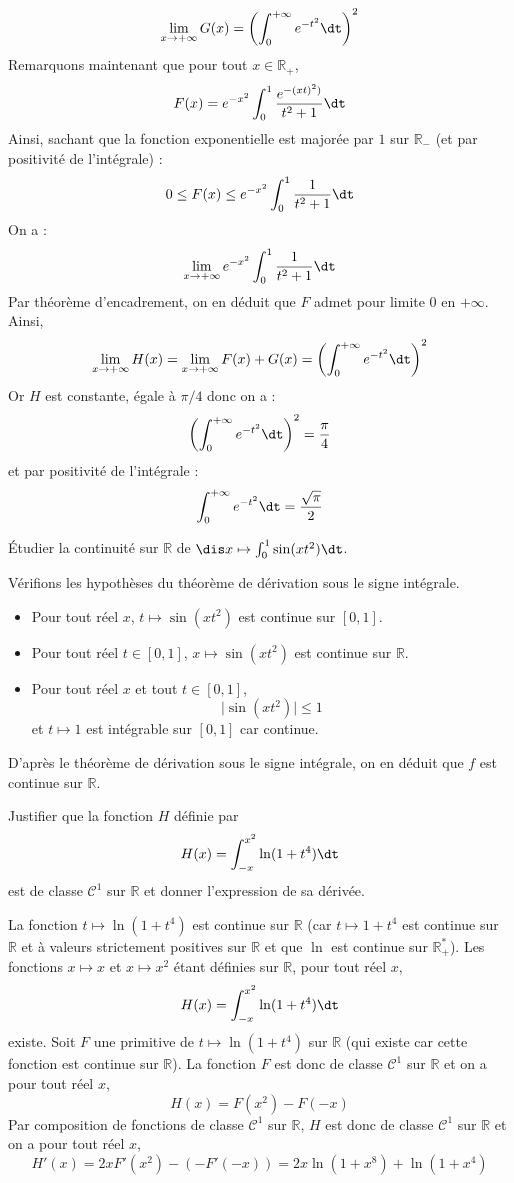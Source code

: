 \documentclass[a4paper,10pt]{report}
\begin{document}
\begin{enumerate}
$$ \lim_{x \rightarrow + \infty} G(x) = \left( \int_{0}^{+ \infty} e^{-t^2} \dt \right)^2$$
Remarquons maintenant que pour tout $x \in \mathbb{R}_+$,
$$ F(x) = e^{-x^2} \int_{0}^1 \frac{e^{-(xt)^2)}}{t^2+1} \dt $$
Ainsi, sachant que la fonction exponentielle est majorée par $1$ sur $\mathbb{R}_{-}$ (et par positivité de l'intégrale) :
$$ 0 \leq F(x)   \leq e^{-x^2} \int_{0}^1 \frac{1}{t^2+1} \dt $$
On a :
$$ \lim_{x \rightarrow + \infty} e^{-x^2} \int_{0}^1 \frac{1}{t^2+1} \dt$$
Par théorème d'encadrement, on en déduit que $F$ admet pour limite $0$ en $+ \infty$. Ainsi,
$$ \lim_{x \rightarrow + \infty} H(x) = \lim_{x \rightarrow + \infty} F(x) + G(x) =  \left( \int_{0}^{+ \infty} e^{-t^2} \dt \right)^2$$
Or $H$ est constante, égale à $\pi/4$ donc on a :
$$ \left( \int_{0}^{+ \infty} e^{-t^2} \dt \right)^2 = \dfrac{\pi}{4}$$
et par positivité de l'intégrale :
$$  \int_{0}^{+ \infty} e^{-t^2} \dt  = \dfrac{\sqrt{\pi}}{2}$$
\end{enumerate}

\begin{Exa} Étudier la continuité sur $\mathbb{R}$ de $\dis x \mapsto \int_{0}^1 \sin(xt^2) \dt$.
\end{Exa}

\corr Vérifions les hypothèses du théorème de dérivation sous le signe intégrale.

\begin{itemize}
\item Pour tout réel $x$, $t \mapsto \sin(xt^2)$ est continue sur $[0,1]$.
\item Pour tout réel $t \in [0,1]$,  $x \mapsto \sin(xt^2)$ est continue sur $\mathbb{R}$.
\item Pour tout réel $x$ et tout $t \in [0,1]$,
$$ \vert \sin(x t^2) \vert \leq 1$$
et $t \mapsto 1$ est intégrable sur $[0,1]$ car continue.
\end{itemize}
D'après le théorème de dérivation sous le signe intégrale, on en déduit que $f$ est continue sur $\mathbb{R}$.

\begin{Exa} Justifier que la fonction $H$ définie par 
$$H(x) = \int_{-x}^{x^2} \ln(1+t^4) \dt$$
est de classe $\mathcal{C}^1$ sur $\mathbb{R}$ et donner l'expression de sa dérivée.
\end{Exa}

\corr La fonction $t \mapsto \ln(1+t^4)$ est continue sur $\mathbb{R}$ (car $t \mapsto 1+t^4$ est continue sur $\mathbb{R}$ et à valeurs strictement positives sur $\mathbb{R}$ et que $\ln$ est continue sur $\mathbb{R}_+^{*}$). Les fonctions $x \mapsto x$ et $x \mapsto x^2$ étant définies sur $\mathbb{R}$, pour tout réel $x$,
$$ H(x) = \int_{-x}^{x^2} \ln(1+t^4) \dt$$
existe. Soit $F$ une primitive de $t \mapsto \ln(1+t^4)$ sur $\mathbb{R}$ (qui existe car cette fonction est continue sur $\mathbb{R}$). La fonction $F$ est donc de classe $\mathcal{C}^1$ sur $\mathbb{R}$ et on a pour tout réel $x$,
$$ H(x) = F(x^2)-F(-x)$$
Par composition de fonctions de classe $\mathcal{C}^1$ sur $\mathbb{R}$, $H$ est donc de classe $\mathcal{C}^1$ sur $\mathbb{R}$ et on a pour tout réel $x$,
$$ H'(x) = 2x F'(x^2)-(-F'(-x)) = 2x \ln(1+x^8)+ \ln(1+x^4)$$
\end{document}
